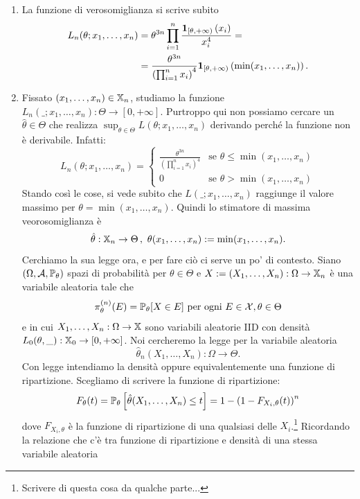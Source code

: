\begin{soluzione}
\begin{enumerate}
\item La funzione di verosomiglianza si scrive subito
\begin{align*}
	L_n (\theta; x_1, \dots, x_n) & = \theta^{3n} \prod_{i = 1}^n \frac{\mathbf 1_{[\theta, +\infty)}\left(x_i\right)}{x_i^4} = \\
	& = \frac{\theta^{3n}}{\left(\prod_{i = 1}^n x_i\right)^4} \mathbf 1_{[\theta, +\infty)}\left(\min(x_1, \dots, x_n)\right) .
\end{align*}

\item Fissato $(x_1, \dots, x_n) \in \mathbb X_n$, studiamo la funzione $L_n(\_; x_1, \dots, x_n) : \Theta \to [0, +\infty]$. Purtroppo qui non possiamo cercare un $\hat\theta \in \Theta$ che realizza $\sup_{\theta \in \Theta} L(\theta; x_1, \dots, x_n)$ derivando perché la funzione non è derivabile. Infatti:
\[
	L_n(\theta; x_1, \dots, x_n) = \begin{cases} \frac{\theta^{3n}}{\left(\prod_{i = 1}^n x_i\right)^4} & \text{se } \theta \le \min(x_1, \dots, x_n) \\ 0 & \text{se } \theta > \min(x_1, \dots, x_n)  \end{cases}
\]
Stando così le cose, si vede subito che $L(\_; x_1, \dots, x_n)$ raggiunge il valore massimo per $\theta = \min(x_1, \dots, x_n)$. Quindi lo stimatore di massima veorosomiglianza è
\[\hat\theta : \mathbb X_n \to \Theta \,,\ \theta(x_1, \dots, x_n) := \min(x_1, \dots, x_n) .\]
Cerchiamo la sua legge ora, e per fare ciò ci serve un po' di contesto. Siano $(\Omega, \mathcal A, \mathbb P_\theta)$ spazi di probabilità per $\theta \in \Theta$ e $X := (X_1, \dots, X_n) : \Omega \to \mathbb X_n$ è una variabile aleatoria tale che
\[
  \pi_\theta^{(n)} (E) = \mathbb P_\theta [X \in E] \text{ per ogni } E \in \mathcal X, \theta \in \Theta
\]
e in cui $X_1, \dots, X_n : \Omega \to \mathbb X$ sono variabili aleatorie IID con densità $L_0(\theta, \_) : \mathbb X_0 \to [0, +\infty]$. Noi cercheremo la legge per la variabile aleatoria
\[
  \hat\theta_n(X_1, \dots, X_n) : \Omega \to \Theta .
\]
Con legge intendiamo la densità oppure equivalentemente una funzione di ripartizione. Scegliamo di scrivere la funzione di ripartizione:
\[F_\theta (t) = \mathbb P_\theta \left[\hat\theta(X_1, \dots, X_n) \le t\right] = 1 - \left(1-F_{X_i, \theta}(t)\right)^n\]
dove $F_{X_i, \theta}$ è la funzione di ripartizione di una qualsiasi delle $X_i$.\footnote{Scrivere di questa cosa da qualche parte...} Ricordando la relazione che c'è tra funzione di ripartizione e densità di una stessa variabile aleatoria

\end{enumerate}
\end{soluzione}
